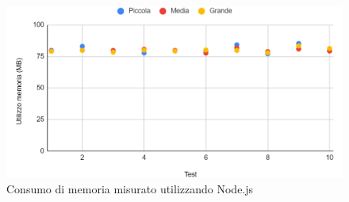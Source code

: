 \begin{figure}
    \begin{center}
            \includegraphics[width=1\columnwidth]{images/node_mem.png}
    \end{center}
    \caption{Consumo di memoria misurato utilizzando Node.js}
\end{figure}
